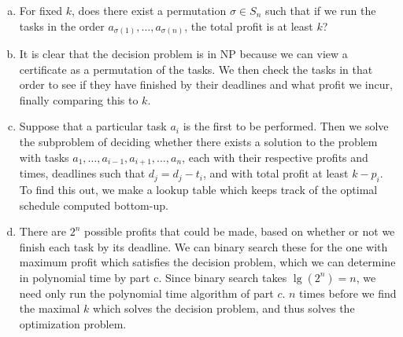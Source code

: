 \documentclass{article}
\begin{document}
\begin{enumerate}[a.]
\item For fixed $k$, does there exist a permutation $\sigma \in S_n$ such that if we run the tasks in the order $a_{\sigma(1)}, \ldots, a_{\sigma(n)}$, the total profit is at least $k$? \\

\item It is clear that the decision problem is in NP because we can view a certificate as a permutation of the tasks.  We then check the tasks in that order to see if they have finished by their deadlines and what profit we incur, finally comparing this to $k$. 

\item Suppose that a particular task $a_i$ is the first to be performed. Then we solve the subproblem of deciding whether there exists a solution to the problem with tasks $a_1, \ldots, a_{i-1}, a_{i+1}, \ldots, a_n$, each with their respective profits and times, deadlines such that $d_j = d_j - t_i$, and with total profit at least $k-p_i$.  To find this out, we make a lookup table which keeps track of the optimal schedule computed bottom-up. 

\item There are $2^n$ possible profits that could be made, based on whether or not we finish each task by its deadline.  We can binary search these for the one with maximum profit which satisfies the decision problem, which we can determine in polynomial time by part c.  Since binary search takes $\lg(2^n) = n$, we need only run the polynomial time algorithm of part $c$. $n$ times before we find the maximal $k$ which solves the decision problem, and thus solves the optimization problem. 
\end{enumerate}
\end{document}
